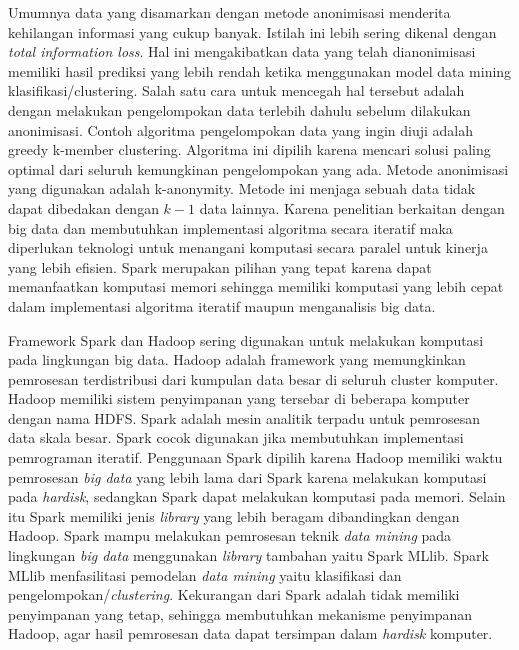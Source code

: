 Umumnya data yang disamarkan dengan metode anonimisasi menderita kehilangan informasi yang cukup banyak. Istilah ini lebih sering dikenal dengan {\it total information loss}. Hal ini mengakibatkan data yang telah dianonimisasi memiliki hasil prediksi yang lebih rendah ketika menggunakan model data mining klasifikasi/clustering. Salah satu cara untuk mencegah hal tersebut adalah dengan melakukan pengelompokan data terlebih dahulu sebelum dilakukan anonimisasi. Contoh algoritma pengelompokan data yang ingin diuji adalah greedy k-member clustering. Algoritma ini dipilih karena mencari solusi paling optimal dari seluruh kemungkinan pengelompokan yang ada. Metode anonimisasi yang digunakan adalah k-anonymity. Metode ini menjaga sebuah data tidak dapat dibedakan dengan $k-1$ data lainnya. Karena penelitian berkaitan dengan big data dan membutuhkan implementasi algoritma secara iteratif maka diperlukan teknologi untuk menangani komputasi secara paralel untuk kinerja yang lebih efisien. Spark merupakan pilihan yang tepat karena dapat memanfaatkan komputasi memori sehingga memiliki komputasi yang lebih cepat dalam implementasi algoritma iteratif maupun menganalisis big data. 

Framework Spark dan Hadoop sering digunakan untuk melakukan komputasi pada lingkungan big data. Hadoop adalah framework yang memungkinkan pemrosesan terdistribusi dari kumpulan data besar di seluruh cluster komputer. Hadoop memiliki sistem penyimpanan yang tersebar di beberapa komputer dengan nama HDFS. Spark adalah mesin analitik terpadu untuk pemrosesan data skala besar. Spark cocok digunakan jika membutuhkan implementasi pemrograman iteratif. Penggunaan Spark dipilih karena Hadoop memiliki waktu pemrosesan \textit{big data} yang lebih lama dari Spark karena melakukan komputasi pada \textit{hardisk}, sedangkan Spark dapat melakukan komputasi pada memori. Selain itu Spark memiliki jenis \textit{library} yang lebih beragam dibandingkan dengan Hadoop. Spark mampu melakukan pemrosesan teknik {\it data mining} pada lingkungan \textit{big data} menggunakan {\it library} tambahan yaitu Spark MLlib. Spark MLlib menfasilitasi pemodelan \textit{data mining} yaitu klasifikasi dan pengelompokan/\textit{clustering}. Kekurangan dari Spark adalah tidak memiliki penyimpanan yang tetap, sehingga membutuhkan  mekanisme penyimpanan Hadoop, agar hasil pemrosesan data dapat tersimpan dalam {\it hardisk} komputer.

